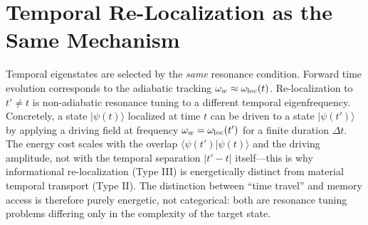 \documentclass[conference,letterpaper,10pt]{IEEEtran}
\begin{document}
\section{Temporal Re-Localization as the Same Mechanism}
Temporal eigenstates are selected by the \emph{same} resonance condition. Forward time evolution corresponds to the
adiabatic tracking \(\omega_w \approx \omega_{\rm loc}(t)\). Re-localization to \(t' \neq t\) is non-adiabatic resonance
tuning to a different temporal eigenfrequency.
Concretely, a state \(|\psi(t)\rangle\) localized at time \(t\) can be driven to a state \(|\psi(t')\rangle\) by applying a
driving field at frequency \(\omega_w = \omega_{\rm loc}(t')\) for a finite duration \(\Delta t\). The energy cost scales
with the overlap \(\langle\psi(t')|\psi(t)\rangle\) and the driving amplitude, not with the temporal separation \(|t'-t|\)
 itself---this is why informational re-localization (Type III) is energetically distinct from material temporal
transport (Type II).
The distinction between ``time travel'' and memory access is therefore purely energetic, not categorical: both are
resonance tuning problems differing only in the complexity of the target state.
\end{document}
